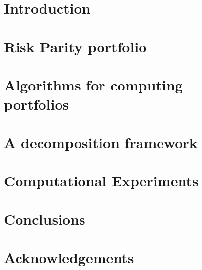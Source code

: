 \documentclass[11pt, titlepage, oneside]{book}
\numberwithin{equation}{section}
\begin{document}
\begin{titlepage}

\end{titlepage} 

\tableofcontents\clearpage
{} 
\chapter{Introduction}


\chapter{Risk Parity portfolio}


\chapter{Algorithms for computing portfolios}


\chapter{A decomposition framework}


\chapter{Computational Experiments}


\chapter{Conclusions}
\chapter{Acknowledgements}
\clearpage

\begin{thebibliography}{9}

\end{thebibliography}
\end{document}
